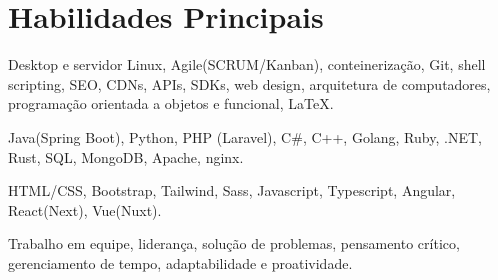 \section{Habilidades Principais}
{Desktop e servidor Linux, Agile(SCRUM/Kanban), conteinerização, Git, shell scripting, SEO, CDNs, APIs, SDKs, web design, arquitetura de computadores, programação orientada a objetos e funcional, {\LaTeX}.}

{Java(Spring Boot), Python, PHP (Laravel), C\#, C++, Golang, Ruby, .NET, Rust, SQL, MongoDB, Apache, nginx.}

{HTML/CSS, Bootstrap, Tailwind, Sass, Javascript, Typescript, Angular, React(Next), Vue(Nuxt).}

{Trabalho em equipe, liderança, solução de problemas, pensamento crítico, gerenciamento de tempo, adaptabilidade e proatividade.}
